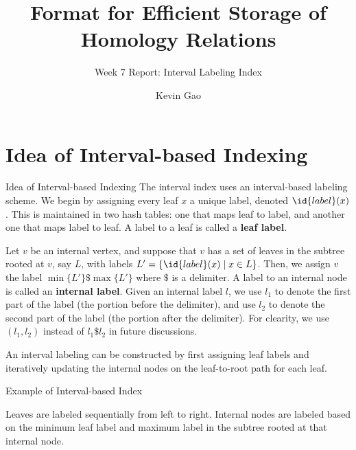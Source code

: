 \documentclass{beamer}
\title{Format for Efficient Storage of Homology Relations}
\subtitle{Week 7 Report: Interval Labeling Index}
\author{Kevin Gao}
\institute{University of Toronto}
\begin{document}
\frame{\titlepage}


\section{Idea of Interval-based Indexing}

\begin{frame}{Idea of Interval-based Indexing}
    The interval index uses an interval-based labeling scheme. We begin by assigning every leaf $x$ a unique label, denoted $\id{label}(x)$. This is maintained in two hash tables: one that maps leaf to label, and another one that maps label to leaf. A label to a leaf is called a \textbf{leaf label}.

    Let $v$ be an internal vertex, and suppose that $v$ has a set of leaves in the subtree rooted at $v$, say $L$, with labels $L' = \{\id{label}(x) \mid x \in L\}$. Then, we assign $v$ the label $\min\{L'\}\$\max\{L'\}$ where $\$$ is a delimiter. A label to an internal node is called an \textbf{internal label}. Given an internal label $l$, we use $l_1$ to denote the first part of the label (the portion before the delimiter), and use $l_2$ to denote the second part of the label (the portion after the delimiter). For clearity, we use $(l_1,l_2)$ instead of $l_1 \$ l_2$ in future discussions.

    An interval labeling can be constructed by first assigning leaf labels and iteratively updating the internal nodes on the leaf-to-root path for each leaf.
\end{frame}

\begin{frame}{Example of Interval-based Index}

        Leaves are labeled sequentially from left to right. Internal nodes are labeled based on the minimum leaf label and maximum label in the subtree rooted at that internal node.
\end{frame}
\end{document}
